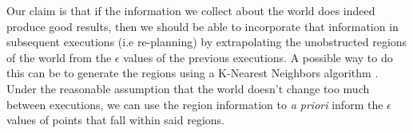 \documentclass[10pt,twoside,twocolumn]{article}
\begin{document}
Our claim is that if the information we collect
about the world does indeed produce good results, then we should be able to incorporate that
information in subsequent executions (i.e re-planning) by extrapolating the unobstructed regions of
the world from the $\epsilon$ values of the previous executions. A possible way to do this can be
to generate the regions using a K-Nearest Neighbors algorithm \cite{citeulike:995135}. Under the reasonable assumption
that the world doesn't change too much between executions, we can use the region information to
\emph{a priori} inform the $\epsilon$ values of points that fall within said regions.


{}

\end{document}
